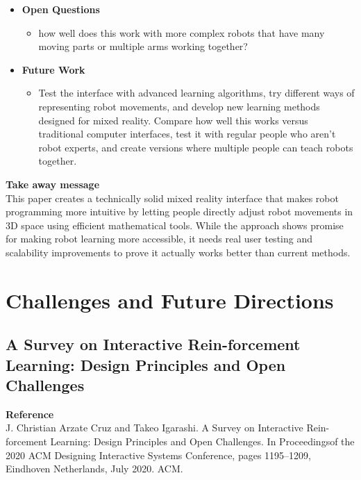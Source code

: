\documentclass[report.tex]{subfiles}
\begin{document}
\begin{itemize}
    \item \noindent\textbf {Open Questions}
    \begin{itemize}
        \item     how well does this work with more complex robots that have many moving parts or multiple arms working together? 

    \end{itemize}
    
    \item \noindent\textbf{Future Work}
    \begin{itemize}
        \item Test the interface with advanced learning algorithms, try different ways of representing robot movements, and develop new learning methods designed for mixed reality. Compare how well this works versus traditional computer interfaces, test it with regular people who aren't robot experts, and create versions where multiple people can teach robots together. 
        
    \end{itemize}
\end{itemize}


\noindent\textbf{Take away message}  \\
This paper creates a technically solid mixed reality interface that makes robot programming more intuitive by letting people directly adjust robot movements in 3D space using efficient mathematical tools. While the approach shows promise for making robot learning more accessible, it needs real user testing and scalability improvements to prove it actually works better than current methods.
















\section{Challenges and Future Directions}
\subsection{A Survey on Interactive Rein-forcement Learning: Design Principles and Open Challenges} 

\noindent\textbf{Reference} \\
\cite{arzate_cruz_survey_2020}J. Christian Arzate Cruz and Takeo Igarashi. A Survey on Interactive Rein-forcement Learning: Design Principles and Open Challenges. In Proceedingsof the 2020 ACM Designing Interactive Systems Conference, pages 1195–1209, Eindhoven Netherlands, July 2020. ACM.
\end{document}
